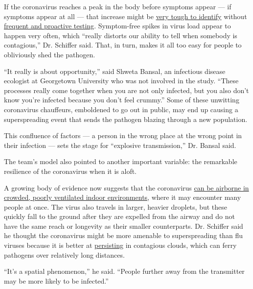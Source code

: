 If the coronavirus reaches a peak in the body before symptoms appear ---
if symptoms appear at all --- that increase might be
\href{https://www.nytimes.com/2020/07/19/health/coronavirus-testing-viral-spread.html}{very
tough to identify} without
\href{https://www.nytimes.com/2020/08/06/health/rapid-Covid-tests.html}{frequent
and proactive testing}. Symptom-free spikes in virus load appear to
happen very often, which ``really distorts our ability to tell when
somebody is contagious,'' Dr. Schiffer said. That, in turn, makes it all
too easy for people to obliviously shed the pathogen.

``It really is about opportunity,'' said Shweta Bansal, an infectious
disease ecologist at Georgetown University who was not involved in the
study. ``These processes really come together when you are not only
infected, but you also don't know you're infected because you don't feel
crummy.'' Some of these unwitting coronavirus chauffeurs, emboldened to
go out in public, may end up causing a superspreading event that sends
the pathogen blazing through a new population.

This confluence of factors --- a person in the wrong place at the wrong
point in their infection --- sets the stage for ``explosive
transmission,'' Dr. Bansal said.

The team's model also pointed to another important variable: the
remarkable resilience of the coronavirus when it is aloft.

A growing body of evidence now suggests that the coronavirus
\href{https://www.nytimes.com/2020/07/09/health/virus-aerosols-who.html}{can
be airborne in crowded, poorly ventilated indoor environments}, where it
may encounter many people at once. The virus also travels in larger,
heavier droplets, but these quickly fall to the ground after they are
expelled from the airway and do not have the same reach or longevity as
their smaller counterparts. Dr. Schiffer said he thought the coronavirus
might be more amenable to superspreading than flu viruses because it is
better at
\href{https://www.nejm.org/doi/full/10.1056/NEJMc2004973}{persisting} in
contagious clouds, which can ferry pathogens over relatively long
distances.

``It's a spatial phenomenon,'' he said. ``People further away from the
transmitter may be more likely to be infected.''

\href{https://www.nytimes.com/news-event/coronavirus?action=click\&pgtype=Article\&state=default\&region=MAIN_CONTENT_3\&context=storylines_faq}{}

